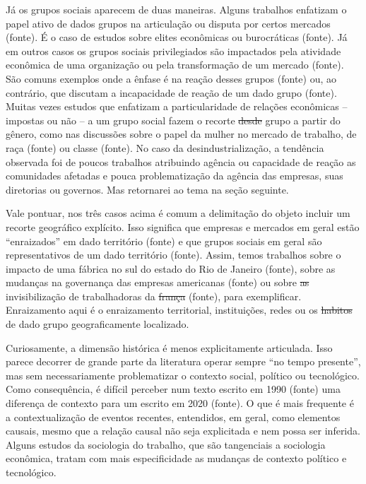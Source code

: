 Já os grupos sociais aparecem de duas maneiras. Alguns trabalhos enfatizam o papel ativo de dados grupos na articulação ou disputa por
certos mercados (fonte). É o caso de estudos sobre elites econômicas ou burocráticas (fonte). Já em outros casos os grupos sociais privilegiados são impactados pela atividade econômica de uma organização ou pela transformação de um mercado (fonte). São comuns exemplos onde a ênfase é na reação desses grupos (fonte) ou, ao contrário, que discutam a incapacidade de reação de um dado grupo (fonte). Muitas vezes estudos que enfatizam a particularidade de relações econômicas --impostas ou não -- a um grupo social fazem o recorte \sout{desde} grupo a partir do gênero, como nas discussões sobre o papel da mulher no mercado de trabalho, de raça (fonte) ou classe (fonte). No caso da desindustrialização, a tendência observada foi de poucos trabalhos atribuindo agência ou capacidade de reação as comunidades afetadas e pouca problematização da agência das empresas, suas diretorias ou governos. Mas retornarei ao tema na seção seguinte.

Vale pontuar, nos três casos acima é comum a delimitação do objeto incluir um recorte geográfico explícito. Isso significa que empresas e mercados em geral estão ``enraizados'' em dado território (fonte) e que grupos sociais em geral são representativos de um dado território (fonte). Assim, temos trabalhos sobre o impacto de uma fábrica no sul do estado do Rio de Janeiro (fonte), sobre as mudanças na governança das empresas americanas (fonte) ou sobre \sout{as} invisibilização de trabalhadoras da \sout{frança} (fonte), para exemplificar. Enraizamento aqui é o enraizamento territorial, instituições, redes ou os \sout{habitos} de dado grupo geograficamente localizado.

Curiosamente, a dimensão histórica é menos explicitamente articulada. Isso parece decorrer de grande parte da literatura operar sempre ``no tempo presente'', mas sem necessariamente problematizar o contexto social, político ou tecnológico. Como consequência, é difícil perceber num texto escrito em 1990 (fonte) uma diferença de contexto para um escrito em 2020 (fonte). O que é mais frequente é a contextualização de eventos recentes, entendidos, em geral, como elementos causais, mesmo que a relação causal não seja explicitada e nem possa ser inferida. Alguns estudos da sociologia do trabalho, que são tangenciais a sociologia econômica, tratam com mais especificidade as
mudanças de contexto político e tecnológico.


